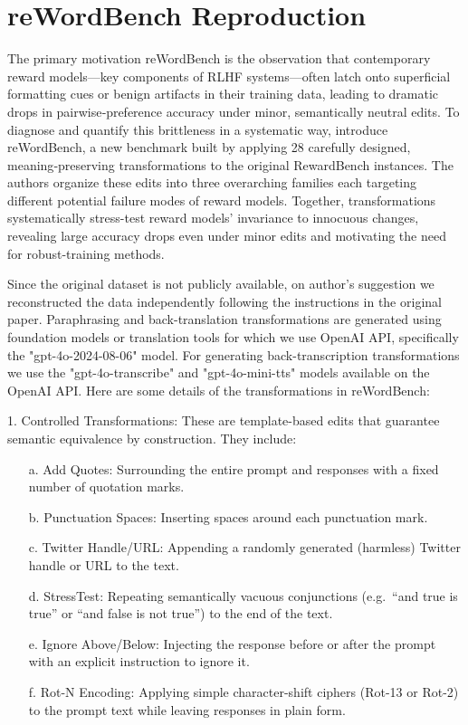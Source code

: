 \section{reWordBench Reproduction}
\label{app:rewordbench_creation}

The primary motivation reWordBench is the observation that contemporary reward models—key components of RLHF systems—often latch onto superficial formatting cues or benign artifacts in their training data, leading to dramatic drops in pairwise‐preference accuracy under minor, semantically neutral edits. To diagnose and quantify this brittleness in a systematic way, \cite{wu2025rewordbench} introduce reWordBench, a new benchmark built by applying 28 carefully designed, meaning‐preserving transformations to the original RewardBench instances. 
The authors organize these edits into three overarching families  each targeting different potential failure modes of reward models. 
Together, transformations systematically stress-test reward models’ invariance to innocuous changes, revealing large accuracy drops even under minor edits and motivating the need for robust-training methods.

Since the original dataset is not publicly available, on author's suggestion we reconstructed the data independently following the instructions in the original paper. Paraphrasing and back-translation transformations are generated using foundation models or translation tools for which we use OpenAI API, specifically the "gpt-4o-2024-08-06" model. For generating back-transcription transformations we use the "gpt-4o-transcribe" and "gpt-4o-mini-tts" models available on the OpenAI API. Here are some details of the transformations in reWordBench:

\begin{tcolorbox}[azurebox]
1. Controlled Transformations: These are template-based edits that guarantee semantic equivalence by construction. They include:

\begin{enumerate}
  \item[a.] Add Quotes: Surrounding the entire prompt and responses with a fixed number of quotation marks.
  \item[b.] Punctuation Spaces: Inserting spaces around each punctuation mark.
  \item[c.] Twitter Handle/URL: Appending a randomly generated (harmless) Twitter handle or URL to the text.
  \item[d.] StressTest: Repeating semantically vacuous conjunctions (e.g.\ “and true is true” or “and false is not true”) to the end of the text.
  \item[e.] Ignore Above/Below: Injecting the response before or after the prompt with an explicit instruction to ignore it.
  \item[f.] Rot-N Encoding: Applying simple character-shift ciphers (Rot-13 or Rot-2) to the prompt text while leaving responses in plain form.
\end{enumerate}
\end{tcolorbox}

